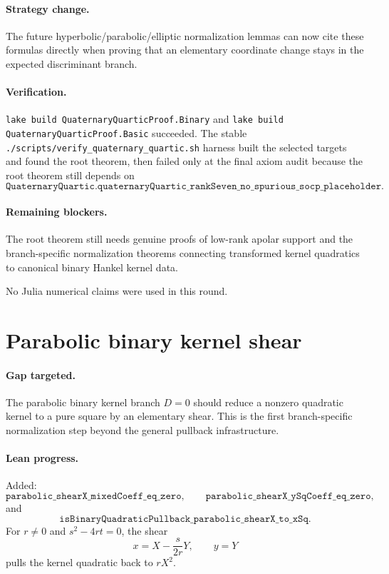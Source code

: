 \documentclass[11pt]{article}
\begin{document}
\paragraph{Strategy change.}
The future hyperbolic/parabolic/elliptic normalization lemmas can now cite
these formulas directly when proving that an elementary coordinate change stays
in the expected discriminant branch.

\paragraph{Verification.}
\texttt{lake build QuaternaryQuarticProof.Binary} and
\texttt{lake build QuaternaryQuarticProof.Basic} succeeded.  The stable
\texttt{./scripts/verify\_quaternary\_quartic.sh} harness built the selected
targets and found the root theorem, then failed only at the final axiom audit
because the root theorem still depends on
\[
\texttt{QuaternaryQuartic.quaternaryQuartic\_rankSeven\_no\_spurious\_socp\_placeholder}.
\]

\paragraph{Remaining blockers.}
The root theorem still needs genuine proofs of low-rank apolar support and the
branch-specific normalization theorems connecting transformed kernel
quadratics to canonical binary Hankel kernel data.

No Julia numerical claims were used in this round.

\section*{Parabolic binary kernel shear}

\paragraph{Gap targeted.}
The parabolic binary kernel branch \(D=0\) should reduce a nonzero quadratic
kernel to a pure square by an elementary shear.  This is the first
branch-specific normalization step beyond the general pullback infrastructure.

\paragraph{Lean progress.}
Added:
\[
\texttt{parabolic\_shearX\_mixedCoeff\_eq\_zero},
\qquad
\texttt{parabolic\_shearX\_ySqCoeff\_eq\_zero},
\]
and
\[
\texttt{isBinaryQuadraticPullback\_parabolic\_shearX\_to\_xSq}.
\]
For \(r\ne0\) and \(s^2-4rt=0\), the shear
\[
x=X-\frac{s}{2r}Y,\qquad y=Y
\]
pulls the kernel quadratic back to \(rX^2\).
\end{document}
